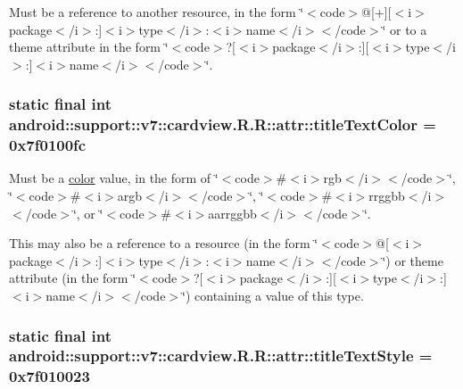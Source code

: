 Must be a reference to another resource, in the form \char`\"{}$<$code$>$@\mbox{[}+\mbox{]}\mbox{[}$<$i$>$package$<$/i$>$:\mbox{]}$<$i$>$type$<$/i$>$:$<$i$>$name$<$/i$>$$<$/code$>$\char`\"{} or to a theme attribute in the form \char`\"{}$<$code$>$?\mbox{[}$<$i$>$package$<$/i$>$:\mbox{]}\mbox{[}$<$i$>$type$<$/i$>$:\mbox{]}$<$i$>$name$<$/i$>$$<$/code$>$\char`\"{}. \hypertarget{classandroid_1_1support_1_1v7_1_1cardview_1_1_r_1_1attr_91f8925041ee28170bede86a42b6c465}{
\subsubsection[{titleTextColor}]{\setlength{\rightskip}{0pt plus 5cm}static final int android::support::v7::cardview.R.R::attr::titleTextColor = 0x7f0100fc}}
\label{classandroid_1_1support_1_1v7_1_1cardview_1_1_r_1_1attr_91f8925041ee28170bede86a42b6c465}


Must be a \hyperlink{classandroid_1_1support_1_1v7_1_1cardview_1_1_r_1_1color}{color} value, in the form of \char`\"{}$<$code$>$\#$<$i$>$rgb$<$/i$>$$<$/code$>$\char`\"{}, \char`\"{}$<$code$>$\#$<$i$>$argb$<$/i$>$$<$/code$>$\char`\"{}, \char`\"{}$<$code$>$\#$<$i$>$rrggbb$<$/i$>$$<$/code$>$\char`\"{}, or \char`\"{}$<$code$>$\#$<$i$>$aarrggbb$<$/i$>$$<$/code$>$\char`\"{}. 

This may also be a reference to a resource (in the form \char`\"{}$<$code$>$@\mbox{[}$<$i$>$package$<$/i$>$:\mbox{]}$<$i$>$type$<$/i$>$:$<$i$>$name$<$/i$>$$<$/code$>$\char`\"{}) or theme attribute (in the form \char`\"{}$<$code$>$?\mbox{[}$<$i$>$package$<$/i$>$:\mbox{]}\mbox{[}$<$i$>$type$<$/i$>$:\mbox{]}$<$i$>$name$<$/i$>$$<$/code$>$\char`\"{}) containing a value of this type. \hypertarget{classandroid_1_1support_1_1v7_1_1cardview_1_1_r_1_1attr_43f791720ba974afecda3efd29727a92}{
\subsubsection[{titleTextStyle}]{\setlength{\rightskip}{0pt plus 5cm}static final int android::support::v7::cardview.R.R::attr::titleTextStyle = 0x7f010023}}
\label{classandroid_1_1support_1_1v7_1_1cardview_1_1_r_1_1attr_43f791720ba974afecda3efd29727a92}


